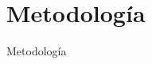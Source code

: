 \documentclass{standalone}
\begin{document}
	\section*{Metodolog\'ia}
	Metodolog\'ia
\end{document}
